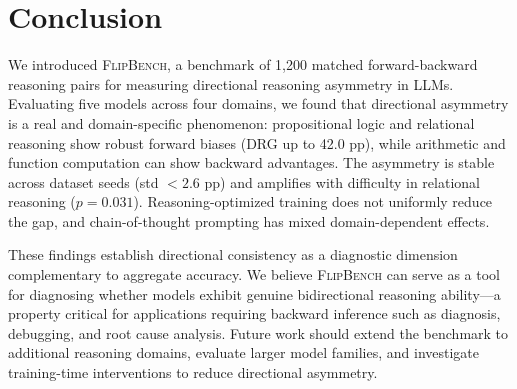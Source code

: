 \documentclass{article}
\newcommand{\flipbench}{\textsc{FlipBench}\xspace}
\begin{document}
\section{Conclusion}
\label{sec:conclusion}

We introduced \flipbench, a benchmark of 1,200 matched forward-backward reasoning pairs for measuring directional reasoning asymmetry in LLMs. Evaluating five models across four domains, we found that directional asymmetry is a real and domain-specific phenomenon: propositional logic and relational reasoning show robust forward biases (DRG up to 42.0 pp), while arithmetic and function computation can show backward advantages. The asymmetry is stable across dataset seeds (std $< 2.6$ pp) and amplifies with difficulty in relational reasoning ($p = 0.031$). Reasoning-optimized training does not uniformly reduce the gap, and chain-of-thought prompting has mixed domain-dependent effects.

These findings establish directional consistency as a diagnostic dimension complementary to aggregate accuracy. We believe \flipbench can serve as a tool for diagnosing whether models exhibit genuine bidirectional reasoning ability---a property critical for applications requiring backward inference such as diagnosis, debugging, and root cause analysis. Future work should extend the benchmark to additional reasoning domains, evaluate larger model families, and investigate training-time interventions to reduce directional asymmetry.


\end{document}
